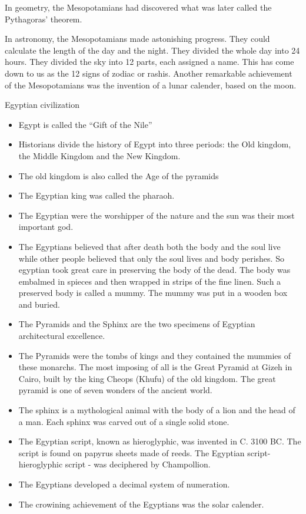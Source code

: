 \documentclass[
  openany]{book}
\providecommand{\tightlist}{%
  \setlength{\itemsep}{0pt}\setlength{\parskip}{0pt}}
\begin{document}
In geometry, the Mesopotamians had discovered what was later called the Pythagoras' theorem.

In astronomy, the Mesopotamians made astonishing progress. They could calculate the length of the day and the night. They divided the whole day into 24 hours. They divided the sky into 12 parts, each assigned a name. This has come down to us as the 12 signs of zodiac or rashis. Another remarkable achievement of the Mesopotamians was the invention of a lunar calender, based on the moon.

Egyptian civilization

\begin{itemize}
\tightlist
\item
  Egypt is called the ``Gift of the Nile''
\item
  Historians divide the history of Egypt into three periods: the Old kingdom, the Middle Kingdom and the New Kingdom.
\item
  The old kingdom is also called the Age of the pyramids
\item
  The Egyptian king was called the pharaoh.
\item
  The Egyptian were the worshipper of the nature and the sun was their most important god.
\item
  The Egyptians believed that after death both the body and the soul live while other people believed that only the soul lives and body perishes. So egyptian took great care in preserving the body of the dead. The body was embalmed in spieces and then wrapped in strips of the fine linen. Such a preserved body is called a mummy. The mummy was put in a wooden box and buried.
\item
  The Pyramids and the Sphinx are the two specimens of Egyptian architectural excellence.
\item
  The Pyramids were the tombs of kings and they contained the mummies of these monarchs. The most imposing of all is the Great Pyramid at Gizeh in Cairo, built by the king Cheops (Khufu) of the old kingdom. The great pyramid is one of seven wonders of the ancient world.
\item
  The sphinx is a mythological animal with the body of a lion and the head of a man. Each sphinx was carved out of a single solid stone.
\item
  The Egyptian script, known as hieroglyphic, was invented in C. 3100 BC. The script is found on papyrus sheets made of reeds. The Egyptian script-hieroglyphic script - was deciphered by Champollion.
\item
  The Egyptians developed a decimal system of numeration.
\item
  The crowining achievement of the Egyptians was the solar calender.
\end{itemize}
\end{document}
